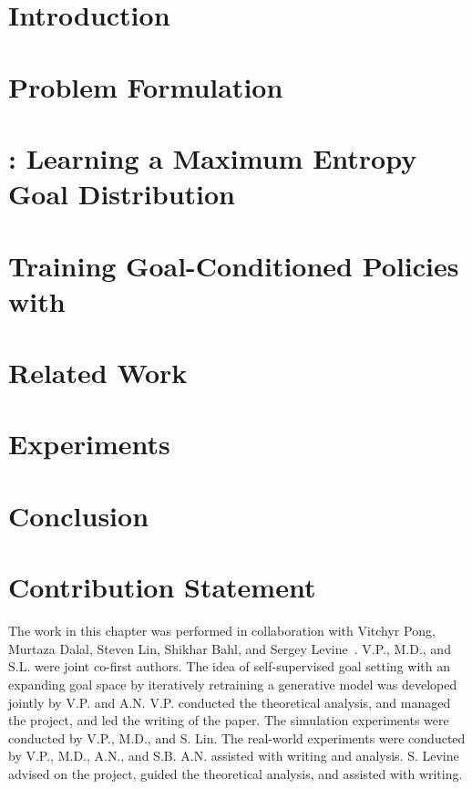 \section{Introduction}\label{sec:introduction}


\setlength{\textfloatsep}{0.5\baselineskip plus 0.2\baselineskip minus 0.2\baselineskip}
\setlength{\dbltextfloatsep}{0.5\baselineskip plus 0.2\baselineskip minus 0.2\baselineskip}

\section{Problem Formulation}\label{sec:background}


\section{\METHOD: Learning a Maximum Entropy Goal Distribution}
\label{sec:method}


\section{Training Goal-Conditioned Policies with \METHOD}
\label{sec:train-policy}


\section{Related Work}\label{sec:related_work}


\section{Experiments}\label{sec:experiments}


\section{Conclusion}\label{sec:conclusion}


\section{Contribution Statement}

The work in this chapter was performed in collaboration with Vitchyr Pong, Murtaza Dalal, Steven Lin, Shikhar Bahl, and Sergey Levine~\citep{pong2019skewfit}. V.P., M.D., and S.L. were joint co-first authors. The idea of self-supervised goal setting with an expanding goal space by iteratively retraining a generative model was developed jointly by V.P. and A.N. V.P. conducted the theoretical analysis, and managed the project, and led the writing of the paper. The simulation experiments were conducted by V.P., M.D., and S. Lin. The real-world experiments were conducted by V.P., M.D., A.N., and S.B. A.N. assisted with writing and analysis. S. Levine advised on the project, guided the theoretical analysis, and assisted with writing.

